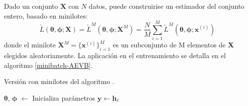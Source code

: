 Dado un conjunto $\textbf{X}$ con $N$ datos, puede construirise un estimador del conjunto entero, basado en minilotes: $$ \tilde{L}(\boldsymbol{\theta}, \boldsymbol{\phi}; \textbf{X}) = \tilde{L}^M(\boldsymbol{\theta}, \boldsymbol{\phi}; \textbf{X}^M) = \frac{N}{M} \sum_{i=1}^{M} \tilde{L}^M(\boldsymbol{\theta}, \boldsymbol{\phi}; \textbf{x}^{(i)})$$ donde el minilote $\textbf{X}^M = \{\textbf{x}^{(i)}\}^M_{i=1}$ es un subconjunto de M elementos de \textbf{X} elegidos aleatoriamente. La aplicación en el entrenamiento se detalla en el algoritmo \autoref{minibatch-AEVB}.

\begin{algorithm}
\label{minibatch-AEVB}
 \caption{Versión con minilotes del algoritmo .}
     \SetAlgoLined
     $\boldsymbol{\theta}$, $\boldsymbol{\phi}$ $\leftarrow$ Inicializa parámetros\;
     $\textbf{y} \leftarrow \textbf{h}_{\ell}$\;
\end{algorithm}



\endinput
